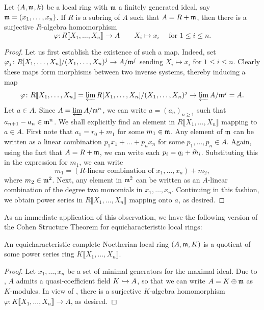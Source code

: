 \begin{lemma}
    Let $(A,\mathfrak{m}, k)$ be a local ring with $\mathfrak{m}$ a finitely generated ideal, say $\mathfrak{m} = (x_1,\dots,x_n)$. If $R$ is a subring of $A$ such that $A = R + \mathfrak{m}$, then there is a surjective $R$-algebra homomorphism 
    \begin{equation*}
        \varphi\colon R\llbracket X_1,\dots,X_n\rrbracket\to A \qquad X_i\mapsto x_i\quad\text{ for } 1\le i\le n.
    \end{equation*}
\end{lemma}
\begin{proof}
    Let us first establish the existence of such a map. Indeed, set $\varphi_j\colon R[X_1,\dots,X_n]/(X_1,\dots,X_n)^j\to A/\mathfrak{m}^j$ sending $X_i\mapsto x_i$ for $1\le i\le n$. Clearly these maps form morphisms between two inverse systems, thereby inducing a map 
    \begin{equation*}
        \varphi\colon R\llbracket X_1,\dots,X_n\rrbracket = \varprojlim R[X_1,\dots,X_n]/(X_1,\dots,X_n)^j\to\varprojlim A/\mathfrak{m}^j = A.
    \end{equation*}
    Let $a\in A$. Since $A = \varprojlim A/\mathfrak{m}^n$, we can write $a = (a_n)_{n\ge 1}$ such that $a_{n + 1} - a_n\in\mathfrak{m}^n$. We shall explicitly find an element in $R\llbracket X_1,\dots,X_n\rrbracket$ mapping to $a\in A$. First note that $a_1 = r_0 + m_1$ for some $m_1\in\mathfrak{m}$. Any element of $\mathfrak{m}$ can be written as a linear combination $p_1 x_1 + \dots + p_nx_n$ for some $p_1,\dots,p_n\in A$. Again, using the fact that $A = R + \mathfrak{m}$, we  can write each $p_i = q_i + \widetilde{m}_i$. Substituting this in the expression for $m_1$, we can write 
    \begin{equation*}
        m_1 = (\text{$R$-linear combination of }x_1,\dots,x_n) + m_2,
    \end{equation*}
    where $m_2\in\mathfrak{m}^2$. Next, any element in $\mathfrak{m}^2$ can be written as an $A$-linear combination of the degree two monomials in $x_1,\dots,x_n$. Continuing in this fashion, we obtain power series in $R\llbracket X_1,\dots,X_n\rrbracket$ mapping onto $a$, as desired.
\end{proof}

As an immediate application of this observation, we have the following version of the Cohen Structure Theorem for equicharacteristic local rings: 

\begin{theorem}
    An equicharacteristic complete Noetherian local ring $(A,\mathfrak{m}, K)$ is a quotient of some power series ring $K\llbracket X_1,\dots, X_n\rrbracket$.
\end{theorem}
\begin{proof}
    Let $x_1,\dots,x_n$ be a set of minimal generators for the maximal ideal. Due to , $A$ admits a quasi-coefficient field $K\hookrightarrow A$, so that we can write $A = K\oplus\mathfrak{m}$ as $K$-modules. In view of , there is a surjective $K$-algebra homomorphism $\varphi\colon K\llbracket X_1,\dots, X_n\rrbracket\to A$, as desired.
\end{proof}

